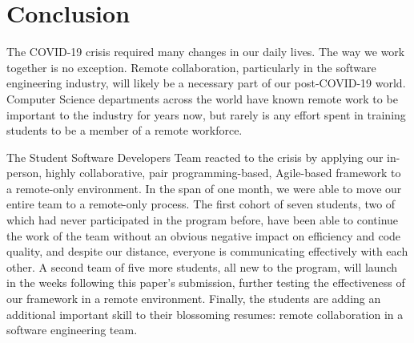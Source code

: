 \section{Conclusion}
The COVID-19 crisis required many changes in our daily lives. The way we work together is no exception. Remote collaboration, particularly in the software engineering industry, will likely be a necessary part of our post-COVID-19 world. Computer Science departments across the world have known remote work to be important to the industry for years now, but rarely is any effort spent in training students to be a member of a remote workforce.

The Student Software Developers Team reacted to the crisis by applying our in-person, highly collaborative, pair programming-based, Agile-based framework to a remote-only environment. In the span of one month, we were able to move our entire team to a remote-only process. The first cohort of seven students, two of which had never participated in the program before, have been able to continue the work of the team without an obvious negative impact on efficiency and code quality, and despite our distance, everyone is communicating effectively with each other. A second team of five more students, all new to the program, will launch in the weeks following this paper's submission, further testing the effectiveness of our framework in a remote environment. Finally, the students are adding an additional important skill to their blossoming resumes: remote collaboration in a software engineering team.
